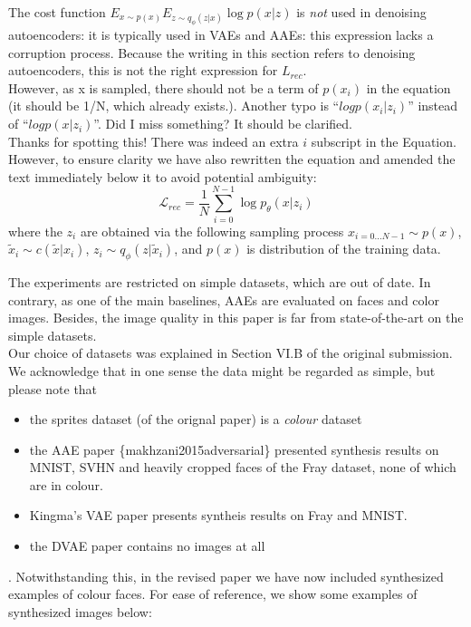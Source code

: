 \documentclass{article}
\begin{document}
The cost function $E_{x\sim p(x)} E_{z\sim q_\phi(z|x)} \log p(x | z)$ is {\em not} used in denoising autoencoders: it is typically used in VAEs and AAEs: this expression lacks a corruption process. Because the writing in this section refers to denoising autoencoders, this is not the right expression for $L_{rec}$.\\

{\color{blue} However, as x is sampled, there should not be a term of $p(x_i)$ in the equation (it should be 1/N, which already exists.). Another typo is “$log p(x_i | z_i)$” instead of “$log p(x | z_i)$”. Did I miss something? It should be clarified.}\\

Thanks for spotting this!  There was indeed an extra $i$ subscript in the Equation. However, to ensure clarity we have also rewritten the equation and amended the text immediately below it to avoid potential ambiguity:
\[ \mathcal{L}_{rec} = \frac{1}{N}\sum_{i=0}^{N-1} \log p_\theta(x|z_i)\]
where the $z_i$ are obtained via the following sampling process $x_{i=0...N-1} \sim p(x)$, $\tilde{x}_i \sim c(\tilde{x}|x_i)$, $z_i \sim q_\phi(z|\tilde{x}_i)$, and $p(x)$ is distribution of the training data.


{\color{blue}
The experiments are restricted on simple datasets, which are out of date. In contrary, as one of the main baselines, AAEs are evaluated on faces and color images. Besides, the image quality in this paper is far from state-of-the-art on the simple datasets.}\\

Our choice of datasets was explained in Section VI.B of the original submission.  We acknowledge that in one sense the data might be regarded as simple, but please note that 
\begin{itemize}
    \item the sprites dataset (of the orignal paper) is a {\em colour} dataset
    \item the AAE paper \{makhzani2015adversarial\} presented {\color{red} synthesis} results on MNIST, SVHN and heavily cropped faces of the Fray dataset, none of which are in colour.
    \item Kingma's VAE paper presents {\color{red}syntheis} results on Fray and MNIST.
    \item the DVAE paper contains no images at all
\end{itemize}. 
Notwithstanding this, in the revised paper we have now included synthesized examples of colour faces. For ease of reference, we show some examples of synthesized images below:\\
\end{document}
